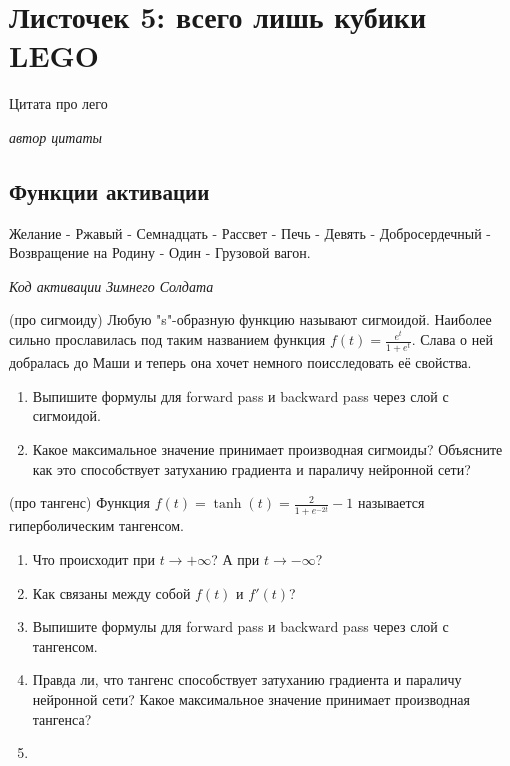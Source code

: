 
\section*{Листочек 5: всего лишь кубики LEGO} 


\epigraph{Цитата про лего}{\textit{автор цитаты}}

\subsection*{Функции активации}

\epigraph{Желание - Ржавый - Семнадцать - Рассвет - Печь - Девять - Добросердечный - Возвращение на Родину - Один - Грузовой вагон.}{\textit{Код активации Зимнего Солдата}}


\begin{problem}{(про сигмоиду)}
Любую "s"-образную функцию называют сигмоидой. Наиболее сильно прославилась под таким названием функция $f(t) = \frac{e^t}{1 + e^t}.$ Слава о ней добралась до Маши и теперь она хочет немного поисследовать её свойства. 

\begin{enumerate}
	\item Выпишите формулы для forward pass и backward pass через слой с сигмоидой. 
	\item Какое максимальное значение принимает производная сигмоиды? Объясните как это способствует затуханию градиента и параличу нейронной сети?  
	\end{enumerate}
\end{problem} 


\begin{problem}{(про тангенс)}
	Функция $f(t) = \tanh(t) = \frac{2}{1 + e^{-2t}} - 1$ называется гиперболическим тангенсом.
	\begin{enumerate}
		\item Что происходит при $t \to +\infty$? А при $t \to -\infty$?
		\item Как связаны между собой $f(t)$ и  $f'(t)$?
		\item Выпишите формулы для forward pass и backward pass через слой с тангенсом. 
		\item Правда ли, что тангенс способствует затуханию градиента и параличу нейронной сети? Какое максимальное значение принимает производная тангенса? 
		\item {}
	\end{enumerate}
\end{problem} 


